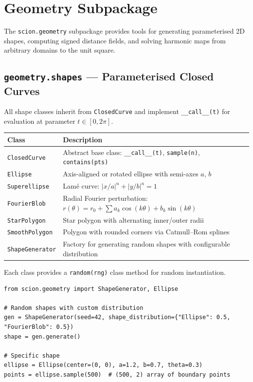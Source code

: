 \documentclass[11pt,a4paper]{report}
\begin{document}
\chapter{Geometry Subpackage}

The \texttt{scion.geometry} subpackage provides tools for generating parameterised 2D shapes, computing signed distance fields, and solving harmonic maps from arbitrary domains to the unit square.

\section{\texttt{geometry.shapes} --- Parameterised Closed Curves}

All shape classes inherit from \texttt{ClosedCurve} and implement \texttt{\_\_call\_\_(t)} for evaluation at parameter $t \in [0, 2\pi]$.

\begin{longtable}{lp{8cm}}
\toprule
\textbf{Class} & \textbf{Description} \\
\midrule
\texttt{ClosedCurve} & Abstract base class: \texttt{\_\_call\_\_(t)}, \texttt{sample(n)}, \texttt{contains(pts)} \\
\texttt{Ellipse} & Axis-aligned or rotated ellipse with semi-axes $a$, $b$ \\
\texttt{Superellipse} & Lam\'e curve: $|x/a|^n + |y/b|^n = 1$ \\
\texttt{FourierBlob} & Radial Fourier perturbation: $r(\theta) = r_0 + \sum a_k \cos(k\theta) + b_k \sin(k\theta)$ \\
\texttt{StarPolygon} & Star polygon with alternating inner/outer radii \\
\texttt{SmoothPolygon} & Polygon with rounded corners via Catmull--Rom splines \\
\texttt{ShapeGenerator} & Factory for generating random shapes with configurable distribution \\
\bottomrule
\end{longtable}

Each class provides a \texttt{random(rng)} class method for random instantiation.

\begin{lstlisting}[caption={Generating and sampling shapes}]
from scion.geometry import ShapeGenerator, Ellipse

# Random shapes with custom distribution
gen = ShapeGenerator(seed=42, shape_distribution={"Ellipse": 0.5, "FourierBlob": 0.5})
shape = gen.generate()

# Specific shape
ellipse = Ellipse(center=(0, 0), a=1.2, b=0.7, theta=0.3)
points = ellipse.sample(500)  # (500, 2) array of boundary points
\end{lstlisting}
\end{document}
